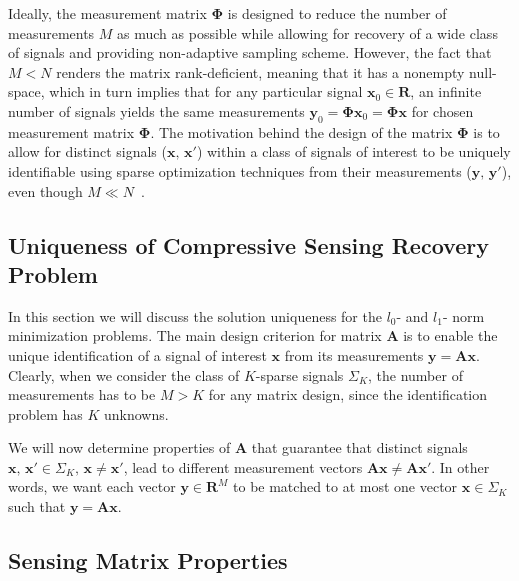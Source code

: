 \documentclass[journal]{IEEEtran}
\begin{document}
Ideally, the measurement matrix $\boldsymbol{\Phi}$ is designed to reduce the number of measurements $M$ as much as possible while allowing for recovery of a wide class of signals and providing non-adaptive sampling scheme. However, the fact that $M<N$ renders the matrix rank-deficient, meaning that it has a nonempty null-space, which in turn implies that for any particular signal $\boldsymbol{x}_0\in \mathbf{R}$, an infinite number of signals yields the same measurements $\boldsymbol{y}_0=\boldsymbol{\Phi} \boldsymbol{x}_0 = \boldsymbol{\Phi} \boldsymbol{x}$ for chosen measurement matrix $\boldsymbol{\Phi}$. The motivation behind the design of the matrix $\boldsymbol{\Phi}$ is to allow for distinct signals ($\boldsymbol{x},\,\boldsymbol{x'}$) within a class of signals of interest to be uniquely identifiable using sparse optimization techniques from their measurements ($\boldsymbol{y},\,\boldsymbol{y'}$), even though $M\ll N$~\cite{Duarte2011}.

\subsection{Uniqueness of Compressive Sensing Recovery Problem}
In this section we will discuss the solution uniqueness for the $l_0$- and $l_1$- norm minimization problems. The main design criterion for matrix $\boldsymbol{A}$ is to enable the unique identification of a signal of interest $\boldsymbol{x}$ from its measurements $\boldsymbol{y}=\boldsymbol{A}\boldsymbol{x}$. Clearly, when we consider the class of $K$-sparse signals $\Sigma_K$, the number of measurements has to be $M>K$ for any matrix design, since the identification problem has $K$ unknowns.

We will now determine properties of $\boldsymbol{A}$ that guarantee that distinct signals $\boldsymbol{x},\,\boldsymbol{x'}\in \Sigma_K,\, \boldsymbol{x}\neq \boldsymbol{x'}$, lead to different measurement vectors $\boldsymbol{A}\boldsymbol{x}\neq \boldsymbol{A}\boldsymbol{x'}$. In other words, we want each vector $\boldsymbol{y}\in \mathbf{R}^M$ to be matched to at most one vector $\boldsymbol{x}\in \Sigma_K$ such that $\boldsymbol{y}=\boldsymbol{A}\boldsymbol{x}$.

\subsection{Sensing Matrix Properties}
\end{document}
